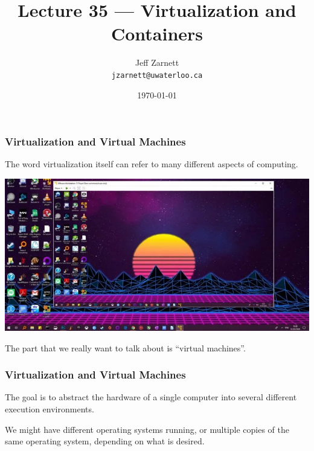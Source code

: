 

\title{Lecture 35 --- Virtualization and Containers }

\author{Jeff Zarnett \\ \small \texttt{jzarnett@uwaterloo.ca}}
\date{\today}




\begin{frame}
  \titlepage

 \end{frame}



\begin{frame}
\frametitle{Virtualization and Virtual Machines}

The word virtualization itself can refer to many different aspects of computing.

\begin{center}
	\includegraphics[width=\textwidth]{images/virtualmachine.jpg}
\end{center}

The part that we really want to talk about is ``virtual machines''. 

 \end{frame}



\begin{frame}
\frametitle{Virtualization and Virtual Machines}

The goal is to abstract the hardware of a single computer into several different execution environments. 

We might have different operating systems running, or multiple copies of the same operating system, depending on what is desired. 

\end{frame}

